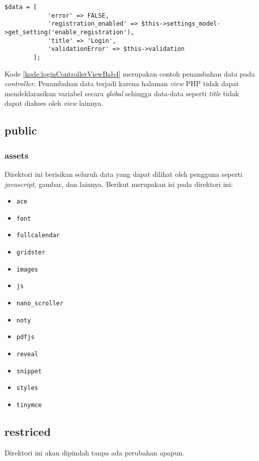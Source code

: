 \begin{lstlisting}[caption=Penambahan kode pada \textit{Login.php}, label=kode:loginControllerViewBab4]
	$data = [
			'error' => FALSE,
			'registration_enabled' => $this->settings_model->get_setting('enable_registration'),
			'title' => 'Login',
			'validationError' => $this->validation
		];
\end{lstlisting}

Kode \ref{kode:loginControllerViewBab4} merupakan contoh penambahan data pada \textit{controller}. Penambahan data terjadi karena halaman \textit{view} PHP tidak dapat mendeklarasikan variabel secara \textit{global} sehingga data-data seperti \textit{title} tidak dapat diakses oleh \textit{view} lainnya.

\subsection{public}
	\subsubsection{assets}
	Direktori ini berisikan seluruh data yang dapat dilihat oleh pengguna seperti \textit{javascript}, gambar, dan lainnya. Berikut merupakan isi pada direktori ini:
	\begin{itemize}
		\item \texttt{ace}
		\item \texttt{font}
		\item \texttt{fullcalendar}
		\item \texttt{gridster}
		\item \texttt{images}
		\item \texttt{js}
		\item \texttt{nano\_scroller}
		\item \texttt{noty}
		\item \texttt{pdfjs}
		\item \texttt{reveal}
		\item \texttt{snippet}
		\item \texttt{styles}
		\item \texttt{tinymce}
	\end{itemize}

\subsection{restriced}
Direktori ini akan dipindah tanpa ada perubahan apapun.
